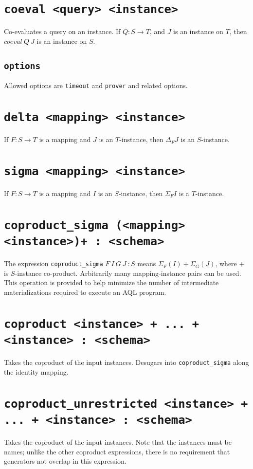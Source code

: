\documentclass[10pt]{book}
\begin{document}
\section{{\tt coeval <query> <instance>}}
Co-evaluates a query on an instance.  If $Q : S \to T$, and $J$ is an instance on $T$, then $coeval \ Q \ J$ is an instance on $S$.
\subsection{\tt options}
Allowed options are {\tt timeout} and {\tt prover} and related options.

\section{{\tt delta <mapping> <instance>}}
If $F : S \to T$ is a mapping and $J$ is an $T$-instance, then $\Delta_F J$ is an $S$-instance. 

\section{{\tt sigma <mapping> <instance>}}
If $F : S \to T$ is a mapping and $I$ is an $S$-instance, then $\Sigma_F I$ is a $T$-instance. 

\section{{\tt coproduct\_sigma (<mapping> <instance>)+ : <schema>}}
The expression {\tt coproduct\_sigma}  $F \ I \ G \ J \ : S$ means $\Sigma_F(I) + \Sigma_G(J)$, where $+$ is $S$-instance co-product.  Arbitrarily many mapping-instance pairs can be used.  This operation is provided to help minimize the number of intermediate materializations required to execute an AQL program.

\section{{\tt coproduct <instance> + ... + <instance> : <schema>}}
Takes the coproduct of the input instances.  Desugars into {\tt coproduct\_sigma} along the identity mapping.

\section{{\tt coproduct\_unrestricted <instance> + ... + <instance> : <schema>}}
Takes the coproduct of the input instances.  Note that the instances must be names; unlike the other coproduct expressions, there is no requirement that generators not overlap in this expression.
\end{document}
